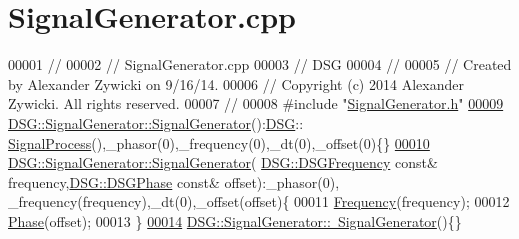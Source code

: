 \hypertarget{_signal_generator_8cpp_source}{\section{Signal\+Generator.\+cpp}
\label{_signal_generator_8cpp_source}
}

\begin{DoxyCode}
00001 \textcolor{comment}{//}
00002 \textcolor{comment}{//  SignalGenerator.cpp}
00003 \textcolor{comment}{//  DSG}
00004 \textcolor{comment}{//}
00005 \textcolor{comment}{//  Created by Alexander Zywicki on 9/16/14.}
00006 \textcolor{comment}{//  Copyright (c) 2014 Alexander Zywicki. All rights reserved.}
00007 \textcolor{comment}{//}
00008 \textcolor{preprocessor}{#include "\hyperlink{_signal_generator_8h}{SignalGenerator.h}"}
\hypertarget{_signal_generator_8cpp_source_l00009}{}\hyperlink{class_d_s_g_1_1_signal_generator_a13ebda67fcdc880ef41aff501cc23fc3}{00009} \hyperlink{class_d_s_g_1_1_signal_generator_a13ebda67fcdc880ef41aff501cc23fc3}{DSG::SignalGenerator::SignalGenerator}():\hyperlink{namespace_d_s_g}{DSG}::
      \hyperlink{class_d_s_g_1_1_signal_process}{SignalProcess}(),\_phasor(0),\_frequency(0),\_dt(0),\_offset(0)\{\}
\hypertarget{_signal_generator_8cpp_source_l00010}{}\hyperlink{class_d_s_g_1_1_signal_generator_a4036fceff5c05a3711b8516d850c414c}{00010} \hyperlink{class_d_s_g_1_1_signal_generator_a13ebda67fcdc880ef41aff501cc23fc3}{DSG::SignalGenerator::SignalGenerator}(
      \hyperlink{namespace_d_s_g_a4315a061386fa1014fda09b15d3a6973}{DSG::DSGFrequency} \textcolor{keyword}{const}& frequency,\hyperlink{namespace_d_s_g_a44431ce1eb0a7300efdd207bc879e52c}{DSG::DSGPhase} \textcolor{keyword}{const}& offset):\_phasor(0),
      \_frequency(frequency),\_dt(0),\_offset(offset)\{
00011     \hyperlink{class_d_s_g_1_1_signal_generator_a4e6b3c43e76e53f8cd337ad699c464cb}{Frequency}(frequency);
00012     \hyperlink{class_d_s_g_1_1_signal_generator_a17cc4287b2838c6b6194fd43d02e7c00}{Phase}(offset);
00013 \}
\hypertarget{_signal_generator_8cpp_source_l00014}{}\hyperlink{class_d_s_g_1_1_signal_generator_a7b52d391974bc36a19fdcf617ad976cb}{00014} \hyperlink{class_d_s_g_1_1_signal_generator_a7b52d391974bc36a19fdcf617ad976cb}{DSG::SignalGenerator::~SignalGenerator}()\{\}
\end{DoxyCode}
